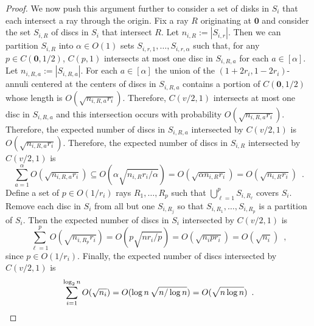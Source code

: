 \documentclass{patmorin}
\begin{document}
\begin{proof}
  We now push this argument further to consider a set of disks in $S_i$ that each intersect a ray through the origin. Fix a ray $R$ originating at $\mathbf{0}$ and consider the set $S_{i,R}$ of discs in $S_i$ that intersect $R$. Let $n_{i,R}:=|S_{i,r}|$.  Then we can partition $S_{i,R}$ into $\alpha\in O(1)$ sets $S_{i,r,1},\ldots,S_{i,r,\alpha}$ such that, for any $p\in C(\mathbf{0},1/2)$,  $C(p,1)$ intersects at most one disc in $S_{i,R,a}$ for each $a\in[\alpha]$.  Let $n_{i,R,a}:=|S_{i,R,a}|$. For each $a\in[\alpha]$ the union of the $(1+2r_i,1-2r_i)$-annuli centered at the centers of discs in $S_{i,R,a}$ contains a portion of $C(\mathbf{0},1/2)$ whose length is $O(\sqrt{n_{i,R,a}r_i})$.  Therefore, $C(v/2,1)$ intersects at most one disc in $S_{i,R,a}$ and this intersection occurs with probability $O(\sqrt{n_{i,R,a}r_i})$.  Therefore, the expected number of discs in $S_{i,R,a}$ intersected by $C(v/2,1)$ is $O(\sqrt{n_{i,R,a}r_i})$.  Therefore, the expected number of discs in $S_{i,R}$ intersected by $C(v/2,1)$ is
  \[
    \sum_{a=1}^\alpha O(\sqrt{n_{i,R,a}r_i}) \subseteq O(\alpha\sqrt{n_{i,R}r_i/\alpha}) = O(\sqrt{\alpha n_{i,R}r_i}) = O(\sqrt{n_{i,R}r_i}) \enspace .
  \]
  Define a set of $p\in O(1/r_i)$ rays $R_1,\ldots,R_p$ such that $\bigcup_{\ell=1}^p S_{i,R_\ell}$ covers $S_i$. Remove each disc in $S_i$ from all but one $S_{i,R_j}$ so that $S_{i,R_1},\ldots,S_{i,R_p}$ is a partition of $S_i$.  Then the expected number of discs in $S_i$ intersected by $C(v/2,1)$ is
  \[
    \sum_{\ell=1}^p O(\sqrt{n_{i,R_p}r_i}) = O(p\sqrt{nr_i/p}) = O(\sqrt{n_ipr_i}) = O(\sqrt{n_i}) \enspace ,
  \]
  since $p\in O(1/r_i)$.
  Finally, the expected number of discs intersected by $C(v/2,1)$ is
  \[
    \sum_{i=1}^{\log_2 n} O(\sqrt{n_i}) = O(\log n\, \sqrt{n/\log n}) = O(\sqrt{n\log n}) \enspace . \qedhere
  \]
\end{proof}
\end{document}

